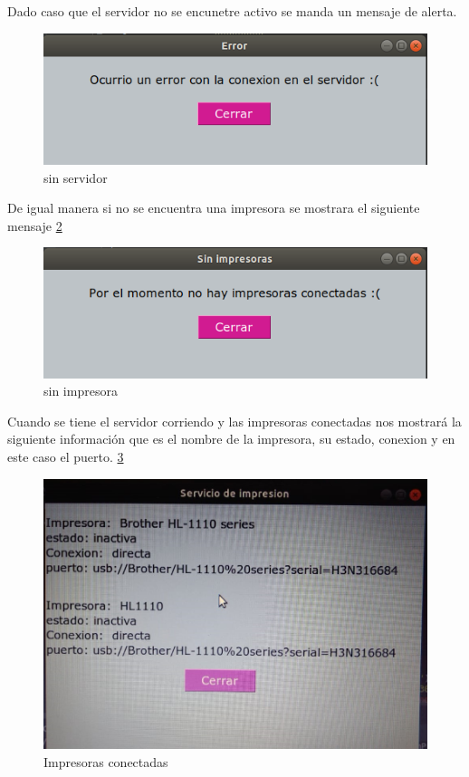 Dado caso que el servidor no se encunetre activo se manda un mensaje de alerta.
\FloatBarrier
\begin{figure}[htbp!]
		\centering
			\includegraphics[width=.9\textwidth]{images/s8}
		\caption{sin servidor}
		\label{image:s8}
\end{figure}
\FloatBarrier

De igual manera si no se encuentra una impresora se mostrara el siguiente mensaje \ref{image:s9}
\FloatBarrier
\begin{figure}[htbp!]
		\centering
			\includegraphics[width=.9\textwidth]{images/s9}
		\caption{sin impresora}
		\label{image:s9}
\end{figure}
\FloatBarrier

Cuando se tiene el servidor corriendo y las impresoras conectadas nos mostrará la siguiente información que es el nombre de la impresora, su estado, conexion y en este caso el puerto. \ref{image:final} 

\FloatBarrier
\begin{figure}[htbp!]
		\centering
			\includegraphics[width=.9\textwidth]{images/final}
		\caption{Impresoras conectadas}
		\label{image:final}
\end{figure}
\FloatBarrier
